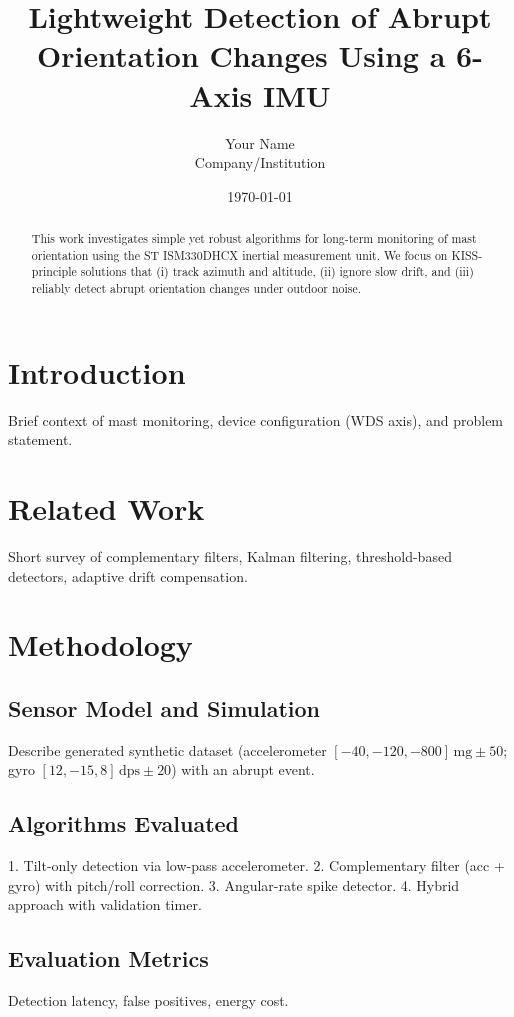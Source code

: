 \documentclass{article} %
\title{Lightweight Detection of Abrupt Orientation Changes Using a 6-Axis IMU}
\author{Your Name \\ Company/Institution}
\date{\today}
\begin{document}
\maketitle

\begin{abstract}
This work investigates simple yet robust algorithms for long-term monitoring of mast orientation using the ST ISM330DHCX inertial measurement unit. We focus on KISS-principle solutions that (i) track azimuth and altitude, (ii) ignore slow drift, and (iii) reliably detect abrupt orientation changes under outdoor noise.
\end{abstract}

\section{Introduction}
Brief context of mast monitoring, device configuration (WDS axis), and problem statement.

\section{Related Work}
Short survey of complementary filters, Kalman filtering, threshold-based detectors, adaptive drift compensation.

\section{Methodology}
\subsection{Sensor Model and Simulation}
Describe generated synthetic dataset (accelerometer $[-40,-120,-800]\,\text{mg}\pm50$; gyro $[12,-15,8]\,\text{dps}\pm20$) with an abrupt event.

\subsection{Algorithms Evaluated}
1. Tilt-only detection via low-pass accelerometer.
2. Complementary filter (acc + gyro) with pitch/roll correction.
3. Angular-rate spike detector.
4. Hybrid approach with validation timer.

\subsection{Evaluation Metrics}
Detection latency, false positives, energy cost.
\end{document}
